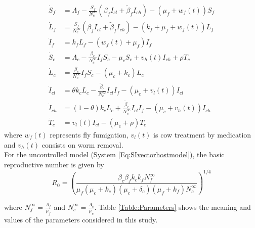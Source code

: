 \documentclass[preprint, 12pt]{elsarticle}
\begin{document}
\begin{equation}\label{Eq:SIvectorhostmodel_v2controlled}
\begin{aligned}
    \dot{S}_f&=
        \Lambda_f-\frac{S_f}{N_c^{\infty}}\left(\beta_fI_{cl}+\tilde{\beta}_fI_{ch} \right)-\left(\mu_f+w_f(t)\right)S_f
    \\
    \dot{L}_f&=
        \frac{S_f}{N_c^{\infty}}\left(\beta_fI_{cl}+\tilde{\beta}_fI_{ch}\right)-\left(k_f+\mu_f+w_f(t)\right)L_f
    \\
    \dot{I}_f&=
        k_f L_f-\left(w_f(t)+\mu_f\right)I_f
    \\
    \dot{S}_c&=
        \Lambda_c-\frac{\beta_c}{N_c^{\infty}}I_fS_c-\mu_cS_c+v_h(t)I_{ch}+\rho T_c
    \\
    \dot{L}_c&=
        \frac{\beta_c}{N_c^{\infty}}I_fS_c-\left(\mu_c+k_c\right)L_c
    \\
    \dot{I}_{cl}&=  \theta k_c L_c- \frac{\tilde{\beta}_c}{N_c^{\infty}}I_{cl}I_f-(\mu_c+v_l(t)) I_{cl}
    \\
    \dot{I}_{ch}&= (1-\theta) k_c L_c + \frac{\tilde{\beta}_c}{N_c^{\infty}}I_{cl}I_f- (\mu_c+v_h(t)) I_{ch}
    \\
    \dot{T}_c&= v_l(t)I_{cl}-\left(\mu_c+\rho\right)T_c
\end{aligned}
\end{equation}
where $w_f(t)$ represents fly fumigation, $v_l(t)$ is cow treatment by medication and $v_h(t)$ consists on worm removal.\\

\noindent For the uncontrolled model (System \ref{Eq:SIvectorhostmodel}), the basic reproductive number is given by
  \begin{equation}\label{eq:R0}
     R_0=\left(\frac{\beta_c\beta_f k_c k_fN_f^{\infty}}{\mu_f(\mu_c+k_c)(\mu_c+\delta_c)(\mu_f+k_f)N_c^{\infty}} \right)^{1/4}
 \end{equation}

\noindent where $
    \displaystyle
    N_f^{\infty}=\frac{\Lambda_f}{\mu_f}
    $
 and
$
    \displaystyle
    N_c^{\infty} = \frac{\Lambda_c}{\mu_c}
$. Table \ref{Table:Parameters} shows
 the meaning and values of the parameters considered in this study.
\end{document}

